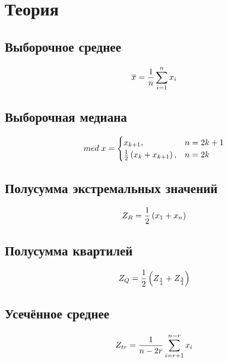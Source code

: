 \documentclass[12pt]{article}
\begin{document}
\section{Теория}

\subsection{Выборочное среднее \cite{average}}

\begin{equation}
\overline{x} = \frac{1}{n}\sum_{i=1}^n x_i \hfill \label{eqn:average}
\end{equation}

\subsection{Выборочная медиана \cite{med}}

\begin{equation}
med\; x = \begin{cases}
x_{k+1}, & n = 2k+1\\
\frac{1}{2}\left(x_k+x_{k+1}\right), & n = 2k
\end{cases} \hfill  \label{eqn:med}
\end{equation}

\subsection{Полусумма экстремальных значений \cite{mean_extr}}

\begin{equation} 
Z_R = \frac{1}{2}\left(x_1+x_n\right) \hfill  \label{eqn:mean_extr}
\end{equation}

\subsection{Полусумма квартилей \cite{quartiles}}

\begin{equation}
Z_Q = \frac{1}{2}\left(Z_{\frac{1}{4}}+Z_{\frac{3}{4}}\right) \hfill  
\label{eqn:quartiles}
\end{equation}

\subsection{Усечённое среднее \cite{cut_mean}}

\begin{equation}
Z_{tr} = \frac{1}{n - 2r}\sum_{i=r+1}^{n-r} x_i \hfill  \label{eqn:cut_mean}
\end{equation}
\end{document}
